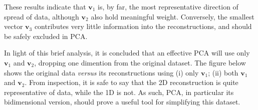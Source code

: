 These results indicate that $\mathbf{v}_1$ is, by far, 
the most representative direction of spread of data,
although $\mathbf{v}_2$ also hold meaningful weight.
Conversely, the smallest vector $\mathbf{v}_3$ contributes very little information
into the reconstructions, and should be safely excluded in PCA.

In light of this brief analysis, it is concluded that an effective PCA will use only 
$\mathbf{v}_1$ and $\mathbf{v}_2$, dropping one dimention from the original dataset.
%
The figure below shows the original data \textit{versus} its reconstructions using 
(i) only $\mathbf{v}_1$;
(ii) both $\mathbf{v}_1$ and $\mathbf{v}_2$.
From inspection, it is safe to say that the 2D reconstruction is quite representative of data,
while the 1D is not.
%
As such, PCA, in particular its bidimensional version, should prove a useful tool for simplifying this dataset.

